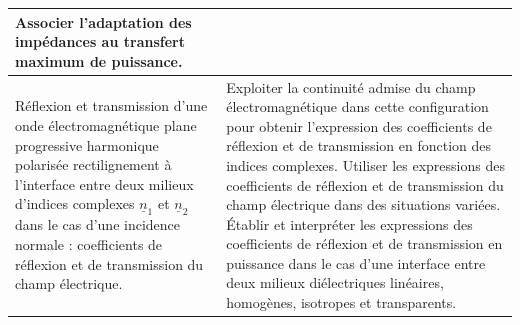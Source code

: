 {\begin{tabularx}{\textwidth}{|p{}|X|}
Associer l'adaptation des impédances au transfert maximum de puissance. \\
            \hline 
            Réflexion et transmission d'une onde électromagnétique plane progressive harmonique polarisée rectilignement à l'interface entre deux milieux d'indices complexes $\underline{n}_1$ et $\underline{n}_2$ dans le cas d'une incidence normale : coefficients de réflexion et de transmission du champ électrique.   & 
            Exploiter la continuité admise du champ électromagnétique dans cette configuration pour obtenir l'expression des coefficients de réflexion et de transmission en fonction des indices complexes.
Utiliser les expressions des coefficients de réflexion et de transmission du champ électrique dans des situations variées. Établir et interpréter les expressions des coefficients de réflexion et de transmission en puissance dans le cas d'une interface entre deux milieux diélectriques linéaires, homogènes, isotropes et transparents. \\
        \hline
        \end{tabularx}
\vspace{0.5cm}
}
